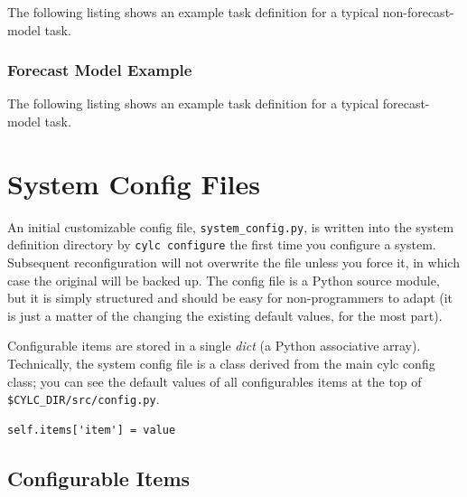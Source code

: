 \documentclass[11pt,a4paper]{article}
\begin{document}
The following listing shows an example task definition for a
typical non-forecast-model task.
\lstset{language=cylctaskdef}

{

}

\subsubsection{Forecast Model Example}

The following listing shows an example task definition for a
typical forecast-model task.

\lstset{language=cylctaskdef}

{

}


\section{System Config Files}
\label{SystemConfigFiles}

An initial customizable config file, \lstinline=system_config.py=, is
written into the system definition directory by 
\lstinline=cylc configure= the first time you configure a system.
Subsequent reconfiguration will not overwrite the file unless you force
it, in which case the original will be backed up. The config file is a
Python source module, but it is simply structured and should be easy for
non-programmers to adapt (it is just a matter of the changing the
existing default values, for the most part). 

Configurable items are stored in a single {\em dict} (a Python
associative array). Technically, the system config file is a class
derived from the main cylc config class; you can see the default
values of all configurables items at the top of
\lstinline=$CYLC_DIR/src/config.py=.

\lstset{language=Python}
\begin{lstlisting}
self.items['item'] = value
\end{lstlisting}

\subsection{Configurable Items}
\label{ConfigurableItems}
\end{document}
